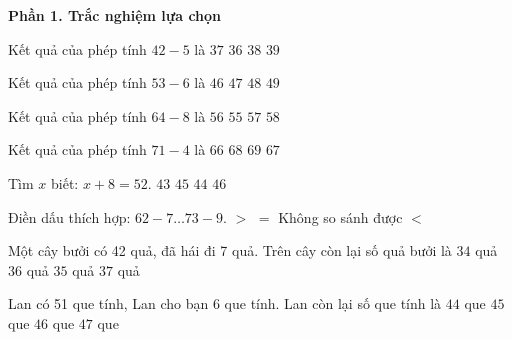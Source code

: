 \textbf{Phần 1. Trắc nghiệm lựa chọn}

\begin{ex} %
Kết quả của phép tính $42 - 5$ là
\choice
{\True $37$}
{$36$}
{$38$}
{$39$}
\end{ex}

\begin{ex} %
Kết quả của phép tính $53 - 6$ là
\choice
{$46$}
{\True $47$}
{$48$}
{$49$}
\end{ex}

\begin{ex} %
Kết quả của phép tính $64 - 8$ là
\choice
{\True $56$}
{$55$}
{$57$}
{$58$}
\end{ex}

\begin{ex} %
Kết quả của phép tính $71 - 4$ là
\choice
{$66$}
{$68$}
{$69$}
{\True $67$}
\end{ex}

\begin{ex} %
Tìm $x$ biết: $x + 8 = 52$.
\choice
{$43$}
{$45$}
{\True $44$}
{$46$}
\end{ex}

\begin{ex} %
Điền dấu thích hợp: $62 - 7 \dots 73 - 9$.
\choice
{$>$}
{$=$}
{Không so sánh được}
{\True $<$}
\end{ex}

\begin{ex} %
Một cây bưởi có 42 quả, đã hái đi 7 quả. Trên cây còn lại số quả bưởi là
\choice
{$34$ quả}
{$36$ quả}
{\True $35$ quả}
{$37$ quả}
\end{ex}

\begin{ex} %
Lan có 51 que tính, Lan cho bạn 6 que tính. Lan còn lại số que tính là
\choice
{$44$ que}
{\True $45$ que}
{$46$ que}
{$47$ que}
\end{ex}

